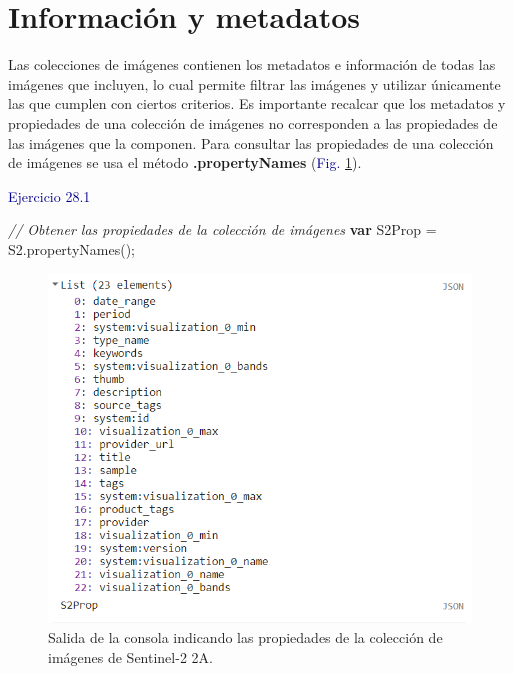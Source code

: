\documentclass[
  12pt,
  letterpaper,
  twoside]{book}
\newenvironment{Shaded}{\begin{snugshade}}{\end{snugshade}}
\newcommand{\CommentTok}[1]{\textcolor[rgb]{0.24,0.58,0.00}{\textit{#1}}}
\newcommand{\FunctionTok}[1]{\textcolor[rgb]{0.48,0.12,0.64}{#1}}
\newcommand{\KeywordTok}[1]{\textcolor[rgb]{0.00,0.00,0.00}{\textbf{#1}}}
\newcommand{\NormalTok}[1]{#1}
\newcommand{\OperatorTok}[1]{\textcolor[rgb]{0.00,0.00,0.00}{#1}}
\newcommand\boldpurple[1]{\textcolor{darkpurple}{\textbf{#1}}}
\begin{document}
\hypertarget{informaciuxf3n-y-metadatos-4}{%
\section{Información y metadatos}\label{informaciuxf3n-y-metadatos-4}}

Las colecciones de imágenes contienen los metadatos e información de todas las imágenes que incluyen, lo cual permite filtrar las imágenes y utilizar únicamente las que cumplen con ciertos criterios. Es importante recalcar que los metadatos y propiedades de una colección de imágenes no corresponden a las propiedades de las imágenes que la componen. Para consultar las propiedades de una colección de imágenes se usa el método \boldpurple{.propertyNames} (\textcolor{darkblue}{Fig.} \ref{fig:f101}).

\newpage

\textcolor{darkblue}{Ejercicio 28.1}

\begin{Shaded}
\begin{Highlighting}[]
\CommentTok{// Obtener las propiedades de la colección de imágenes}
\KeywordTok{var}\NormalTok{ S2Prop }\OperatorTok{=}\NormalTok{ S2}\OperatorTok{.}\FunctionTok{propertyNames}\NormalTok{()}\OperatorTok{;}
\end{Highlighting}
\end{Shaded}

\begin{figure}[H]

{\centering \includegraphics[width=0.8\linewidth]{Img/s2properties} 

}

\caption{Salida de la consola indicando las propiedades de la colección de imágenes de Sentinel-2 2A.}\label{fig:f101}
\end{figure}
\end{document}
